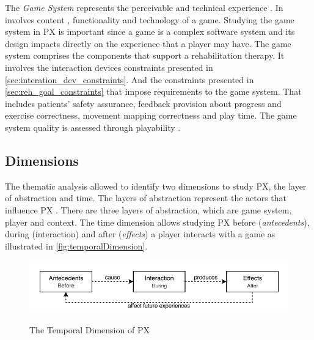 The \textit{Game System} represents the perceivable and technical experience \autocite{Nackea2,Elson2014}. In involves content \autocite{Elson2014,Nackea2,Fernandez2008}, functionality \autocite{Engl2013,Nacked} and technology \autocite{Engl2013,Fernandez2008} of a game. Studying the game system in \ac{PX} is important since a game is a complex software system \autocite{Mayra,Nackea} and its design impacts directly on the experience that a player may have. The game system comprises the components that support a rehabilitation therapy. It involves the interaction devices constraints presented in \autoref{sec:interation_dev_constraints}. And the constraints presented in \autoref{sec:reh_goal_constraints} that impose requirements to the game system. That includes patients' safety assurance, feedback provision about progress and exercise correctness, movement mapping correctness and play time. The game system quality is assessed through playability \autocite{Engl2013,Nackea2}.

\subsection{Dimensions}
The thematic analysis allowed to identify two dimensions to study \ac{PX}, the layer of abstraction and time. The layers of abstraction represent the actors that influence \ac{PX} \autocite{Nacked,Nackea2,Engl2013,Elson2014}. There are three layers of abstraction, which are game system, player and context. The time dimension allows studying \ac{PX} before (\textit{antecedents}), during (interaction) and after (\textit{\textit{effects}}) a player interacts with a game \autocite{Elson2014,Fernandez2008,Nackea2,Nackea,Nacked} as illustrated in \autoref{fig:temporalDimension}.

\begin{figure}[bth]
\myfloatalign
{\includegraphics[width=.9\linewidth]{gfx/model/temporalDimension}} \quad
\caption{The Temporal Dimension of  \ac{PX}}\label{fig:temporalDimension}
\end{figure}

